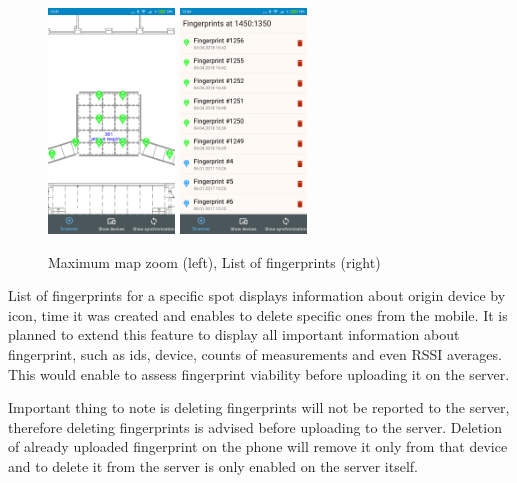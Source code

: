 \begin{figure}[h!]
	\begin{centering}
		\includegraphics[width=0.30\textwidth]{img/map_zoom}
		\includegraphics[width=0.30\textwidth]{img/map_list_fingerprints}
		\par\end{centering}
	\caption{Maximum map zoom (left), List of fingerprints (right)\label{fig:map_zoom_and_list}}
	\label{fig05c05}
\end{figure}

List of fingerprints for a specific spot displays information about origin device by icon, time it was created and enables to delete specific ones from the mobile. It is planned to extend this feature to display all important information about fingerprint, such as ids, device, counts of measurements and even RSSI averages. This would enable to assess fingerprint viability before uploading it on the server.

Important thing to note is deleting fingerprints will not be reported to the server, therefore deleting fingerprints is advised before uploading to the server. Deletion of already uploaded fingerprint on the phone will remove it only from that device and to delete it from the server is only enabled on the server itself. 

